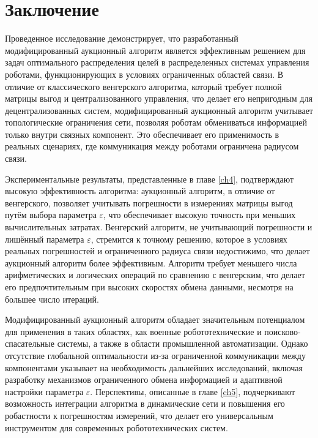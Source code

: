 \chapter*{Заключение} \label{ch-conclusion}


Проведенное исследование демонстрирует, что разработанный модифицированный аукционный алгоритм является эффективным решением для задач оптимального распределения целей в распределенных системах управления роботами, функционирующих в условиях ограниченных областей связи. В отличие от классического венгерского алгоритма, который требует полной матрицы выгод и централизованного управления, что делает его непригодным для децентрализованных систем, модифицированный аукционный алгоритм учитывает топологические ограничения сети, позволяя роботам обмениваться информацией только внутри связных компонент. Это обеспечивает его применимость в реальных сценариях, где коммуникация между роботами ограничена радиусом связи.

Экспериментальные результаты, представленные в главе \ref{ch4}, подтверждают высокую эффективность алгоритма: аукционный алгоритм, в отличие от венгерского, позволяет учитывать погрешности в измерениях матрицы выгод путём выбора параметра $\varepsilon$, что обеспечивает высокую точность при меньших вычислительных затратах. Венгерский алгоритм, не учитывающий погрешности и лишённый параметра $\varepsilon$, стремится к точному решению, которое в условиях реальных погрешностей и ограниченного радиуса связи недостижимо, что делает аукционный алгоритм более эффективным. Алгоритм требует меньшего числа арифметических и логических операций по сравнению с венгерским, что делает его предпочтительным при высоких скоростях обмена данными, несмотря на большее число итераций.

Модифицированный аукционный алгоритм обладает значительным потенциалом для применения в таких областях, как военные робототехнические и поисково-спасательные системы, а также в области промышленной автоматизации. Однако отсутствие глобальной оптимальности из-за ограниченной коммуникации между компонентами указывает на необходимость дальнейших исследований, включая разработку механизмов ограниченного обмена информацией и адаптивной настройки параметра $\varepsilon$. Перспективы, описанные в главе  \ref{ch5}, подчеркивают возможность интеграции алгоритма в динамические сети и повышения его робастности к погрешностям измерений, что делает его универсальным инструментом для современных робототехнических систем.

